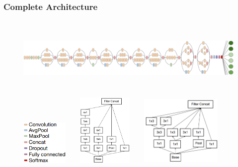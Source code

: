 \documentclass{beamer}
\begin{document}
\begin{frame}
	\frametitle{Complete Architecture}
	\begin{figure}
		\includegraphics[width=\textwidth, height=4cm]{./figures/edit/inception_v3.png} \\
		\includegraphics[width=0.2\textwidth]{./figures/edit/inception_layers.png} 
		\hspace{1em}
		\includegraphics[width=0.35\textwidth, height=3.5cm]{./figures/edit/breakdown_02.png}		
		\includegraphics[width=0.35\textwidth, height=3.5cm]{./figures/edit/breakdown_coarse.png}		
	\end{figure}
\end{frame}
\end{document}
